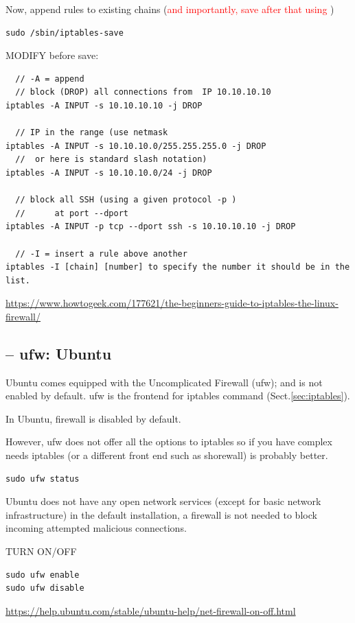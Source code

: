 Now, append rules to existing chains (\textcolor{red}{and importantly, save
after that using })
\begin{verbatim}
sudo /sbin/iptables-save
\end{verbatim}

MODIFY before save:
\begin{verbatim}
  // -A = append
  // block (DROP) all connections from  IP 10.10.10.10
iptables -A INPUT -s 10.10.10.10 -j DROP
 
  // IP in the range (use netmask
iptables -A INPUT -s 10.10.10.0/255.255.255.0 -j DROP
  //  or here is standard slash notation)
iptables -A INPUT -s 10.10.10.0/24 -j DROP

  // block all SSH (using a given protocol -p )
  //      at port --dport
iptables -A INPUT -p tcp --dport ssh -s 10.10.10.10 -j DROP

  // -I = insert a rule above another
iptables -I [chain] [number] to specify the number it should be in the list.
\end{verbatim}
\url{https://www.howtogeek.com/177621/the-beginners-guide-to-iptables-the-linux-firewall/}


\subsection{-- ufw: Ubuntu}
\label{sec:ufw-firewall}

Ubuntu comes equipped with the Uncomplicated Firewall (ufw); and is not enabled
by default. ufw is the  frontend for iptables command (Sect.\ref{sec:iptables}).

In Ubuntu, firewall is disabled by default.

However, ufw does not offer all the options to iptables so if you have complex
needs iptables (or a different front end such as shorewall) is probably better.

\begin{verbatim}
sudo ufw status
\end{verbatim}

Ubuntu does not have any open network services (except for basic network
infrastructure) in the default installation, a firewall is not needed to block
incoming attempted malicious connections. 

TURN ON/OFF
\begin{verbatim}
sudo ufw enable
sudo ufw disable
\end{verbatim}
\url{https://help.ubuntu.com/stable/ubuntu-help/net-firewall-on-off.html}

